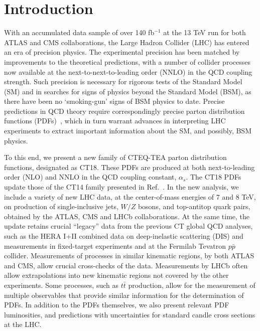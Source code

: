 \section{\label{sec:Introduction} Introduction}

With an accumulated data sample of over 140 fb$^{-1}$ at the 13 TeV run for both ATLAS and CMS collaborations, the Large Hadron Collider (LHC) has entered an era of precision physics.
The experimental precision has been matched by improvements to the theoretical predictions, with a number of collider processes now available at the next-to-next-to-leading order
(NNLO) in the QCD coupling strength. Such precision is necessary for rigorous tests of the Standard Model (SM) and in searches for signs of physics beyond the Standard Model
(BSM), as there have been no `smoking-gun' signs of BSM physics to date. Precise predictions in QCD theory require correspondingly precise parton distribution
functions (PDFs)~\cite{Dulat:2015mca,Harland-Lang:2014zoa,Ball:2017nwa,Alekhin:2017kpj,Accardi:2016qay,Harland-Lang:2019pla,Bertone:2017bme,Manohar:2017eqh},
which in turn warrant advances in interpreting LHC experiments to extract important information about the SM, and possibly, BSM physics.

To this end, we present a new family of CTEQ-TEA parton distribution functions, designated as CT18. These PDFs are produced at both next-to-leading order (NLO) and NNLO in the QCD coupling constant, $\alpha_s$. The CT18 PDFs update those of the CT14 family presented in Ref.~\cite{Dulat:2015mca}.
In the new analysis, we include a variety of new LHC data, at the center-of-mass energies of 7 and 8 TeV, on production of single-inclusive jets, $W/Z$ bosons, and top-antitop
quark pairs, obtained by the ATLAS, CMS and LHCb collaborations. At the same time, the update retains crucial ``legacy'' data from the previous CT global QCD analyses, such as the HERA I+II
combined data on deep-inelastic scattering (DIS) and measurements in fixed-target experiments and at the Fermilab Tevatron $p\bar p$ collider. Measurements of processes in similar
kinematic regions, by both ATLAS and CMS, allow crucial cross-checks of the data. Measurements by LHCb often allow extrapolations into new kinematic regions not covered by the other
experiments. Some processes, such as $t\bar{t}$ production, allow for the measurement of multiple observables that provide similar information for the determination of PDFs. 
In addition to the PDFs themselves, we also present relevant PDF luminosities, and predictions with uncertainties for standard candle cross sections at the LHC.

